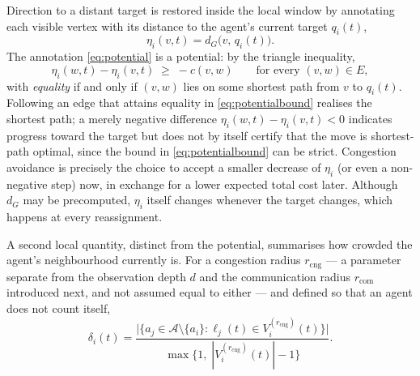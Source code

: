 \documentclass[../main.tex]{subfiles}
\begin{document}
Direction to a distant target is restored inside the local window by annotating
each visible vertex with its distance to the agent's current target $q_i(t)$,
\begin{equation}
  \eta_i(v,t) = d_G\bigl(v,\, q_i(t)\bigr).
  \label{eq:potential}
\end{equation}
The annotation \eqref{eq:potential} is a potential: by the triangle inequality, %
\begin{equation}
  \eta_i(w,t) - \eta_i(v,t) \;\ge\; -c(v,w) \qquad \text{for every } (v,w) \in E,
  \label{eq:potentialbound}
\end{equation}
with \emph{equality} if and only if $(v,w)$ lies on some shortest path from $v$
to $q_i(t)$. Following an edge that attains equality in
\eqref{eq:potentialbound} realises the shortest path; a merely negative
difference $\eta_i(w,t) - \eta_i(v,t) < 0$ indicates progress toward the target
but does not by itself certify that the move is shortest-path optimal, since the
bound in \eqref{eq:potentialbound} can be strict. Congestion avoidance is
precisely the choice to accept a smaller decrease of $\eta_i$ (or even a
non-negative step) now, in exchange for a lower expected total cost later.
Although $d_G$ may be precomputed, $\eta_i$ itself changes whenever the target
changes, which happens at every reassignment.

A second local quantity, distinct from the potential, summarises how crowded %
the agent's neighbourhood currently is. For a congestion radius
$r_{\mathrm{cng}}$ --- a parameter separate from the observation depth $d$ and
the communication radius $r_{\mathrm{com}}$ introduced next, and not assumed
equal to either --- and defined so that an agent does not count itself,
\begin{equation}
  \delta_i(t) =
  \frac{\bigl|\{ a_j \in \mathcal{A}\setminus\{a_i\} :
                 \ell_j(t) \in V^{(r_{\mathrm{cng}})}_i(t) \}\bigr|}
       {\max\bigl\{1,\; |V^{(r_{\mathrm{cng}})}_i(t)| - 1\bigr\}} .
  \label{eq:congestion}
\end{equation}
\end{document}
